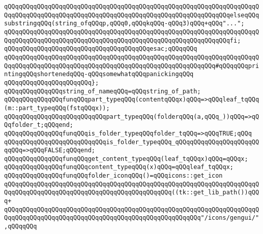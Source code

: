 \verb|qQQqqQQqqQQqqQQqqQQqqQQqqQQqqQQqqQQqqQQqqQQqqQQqqQQqqQQqqQQqqQQqqQQqqQQqqQQqqQQqqQQqqQQqqQQqqQQqqQQqqQQqqQQqqQQqqQQqqQQqqQQqqQQqqQQqelseqQQqsubstringqQQq(string_ofqQQqp,qQQq0,qQQqkqQQq-qQQq3)qQQq+qQQq"...";|\newline
\verb|qQQqqQQqqQQqqQQqqQQqqQQqqQQqqQQqqQQqqQQqqQQqqQQqqQQqqQQqqQQqqQQqqQQqqQQqqQQqqQQqqQQqqQQqqQQqqQQqqQQqqQQqqQQqqQQqqQQqqQQqqQQqqQQqqQQqfi;|\newline
\verb|qQQqqQQqqQQqqQQqqQQqqQQqqQQqqQQqqQQqqQQqesac;qQQqqQQq|\newline
\verb|qQQqqQQqqQQqqQQqqQQqqQQqqQQqqQQqqQQqqQQqqQQqqQQqqQQqqQQqqQQqqQQqqQQqqQQqqQQqqQQqqQQqqQQqqQQqqQQqqQQqqQQqqQQqqQQqqQQqqQQqqQQqqQQq#qQQqqQQqprintingqQQqshortenedqQQq-qQQqsomewhatqQQqpanickingqQQq|\newline
\newline
\verb|qQQqqQQqqQQqqQQqqQQqqQQq};|\newline
\newline
\verb|qQQqqQQqqQQqqQQqstring_of_nameqQQq=qQQqstring_of_path;|\newline
\newline
\newline
\verb|qQQqqQQqqQQqqQQqfunqQQqpart_typeqQQq(contentqQQqx)qQQq=>qQQqleaf_tqQQq(m::part_typeqQQq(fstqQQqx));|\newline
\verb|qQQqqQQqqQQqqQQqqQQqqQQqqQQqpart_typeqQQq(folderqQQq(a,qQQq_))qQQq=>qQQqfolder_t;qQQqend;|\newline
\newline
\verb|qQQqqQQqqQQqqQQqfunqQQqis_folder_typeqQQqfolder_tqQQq=>qQQqTRUE;qQQq|\newline
\verb|qQQqqQQqqQQqqQQqqQQqqQQqqQQqis_folder_typeqQQq_qQQqqQQqqQQqqQQqqQQqqQQqqQQq=>qQQqFALSE;qQQqend;|\newline
\newline
\verb|qQQqqQQqqQQqqQQqfunqQQqget_content_typeqQQq(leaf_tqQQqx)qQQq=qQQqx;|\newline
\verb|qQQqqQQqqQQqqQQqfunqQQqcontent_typeqQQq(x)qQQq=qQQqleaf_tqQQqx;|\newline
\newline
\verb|qQQqqQQqqQQqqQQqfunqQQqfolder_iconqQQq()=qQQqicons::get_icon|\newline
\verb|qQQqqQQqqQQqqQQqqQQqqQQqqQQqqQQqqQQqqQQqqQQqqQQqqQQqqQQqqQQqqQQqqQQqqQQqqQQqqQQqqQQqqQQqqQQqqQQqqQQqqQQqqQQqqQQqqQQq((tk::get_lib_path())qQQq+|\newline
\verb|qQQqqQQqqQQqqQQqqQQqqQQqqQQqqQQqqQQqqQQqqQQqqQQqqQQqqQQqqQQqqQQqqQQqqQQqqQQqqQQqqQQqqQQqqQQqqQQqqQQqqQQqqQQqqQQqqQQqqQQqqQQq"/icons/gengui/",qQQqqQQq|\newline
